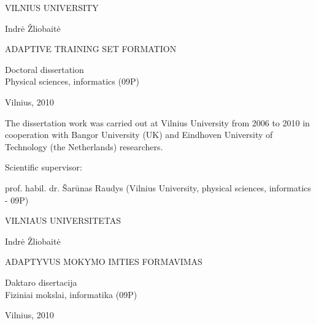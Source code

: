 \thispagestyle{empty}                   %

\begin{center}
	\vspace*{5mm}	
	
	VILNIUS UNIVERSITY \\
	
	
	
	\vspace{45mm}
	
	Indr\.{e} \v{Z}liobait\.{e}	
	\vspace{15mm}
	
  ADAPTIVE TRAINING SET FORMATION

  \vspace{30mm}
  
  Doctoral dissertation\\[-6pt]  
  Physical sciences, informatics (09P)
  
  \vspace{60mm}
  
  Vilnius, 2010
  
\end{center}

\newpage
\thispagestyle{empty}                   %

\begin{singlespace}
\noindent\nohyphens{The dissertation work was carried out at Vilnius University from 2006 to 2010 in cooperation with Bangor University (UK) and Eindhoven University of Technology (the Netherlands) researchers.}

\vspace{1cm}

\noindent Scientific supervisor:

\vspace{1cm}

\noindent\nohyphens{prof. habil. dr. \v{S}ar\={u}nas Raudys (Vilnius University, physical sciences, informatics - 09P)}

\end{singlespace}

\newpage
\thispagestyle{empty}                   %

\begin{center}
	\vspace*{5mm}	
	
	VILNIAUS UNIVERSITETAS \\
		
	
	\vspace{45mm}
	
	Indr\.{e} \v{Z}liobait\.{e}	
	\vspace{15mm}
	
  ADAPTYVUS MOKYMO IMTIES FORMAVIMAS

  \vspace{30mm}
  
  Daktaro disertacija\\[-6pt]  
  Fiziniai mokslai, informatika (09P)
  
  \vspace{60mm}
  
  Vilnius, 2010
  
\end{center}

